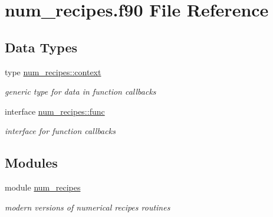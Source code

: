 \hypertarget{num__recipes_8f90}{}\section{num\+\_\+recipes.\+f90 File Reference}
\label{num__recipes_8f90}
\subsection*{Data Types}
\begin{DoxyCompactItemize}
\item 
type \hyperlink{structnum__recipes_1_1context}{num\+\_\+recipes\+::context}
\begin{DoxyCompactList}\small\item\em generic type for data in function callbacks \end{DoxyCompactList}\item 
interface \hyperlink{interfacenum__recipes_1_1func}{num\+\_\+recipes\+::func}
\begin{DoxyCompactList}\small\item\em interface for function callbacks \end{DoxyCompactList}\end{DoxyCompactItemize}
\subsection*{Modules}
\begin{DoxyCompactItemize}
\item 
module \hyperlink{namespacenum__recipes}{num\+\_\+recipes}
\begin{DoxyCompactList}\small\item\em modern versions of numerical recipes routines \end{DoxyCompactList}\end{DoxyCompactItemize}
